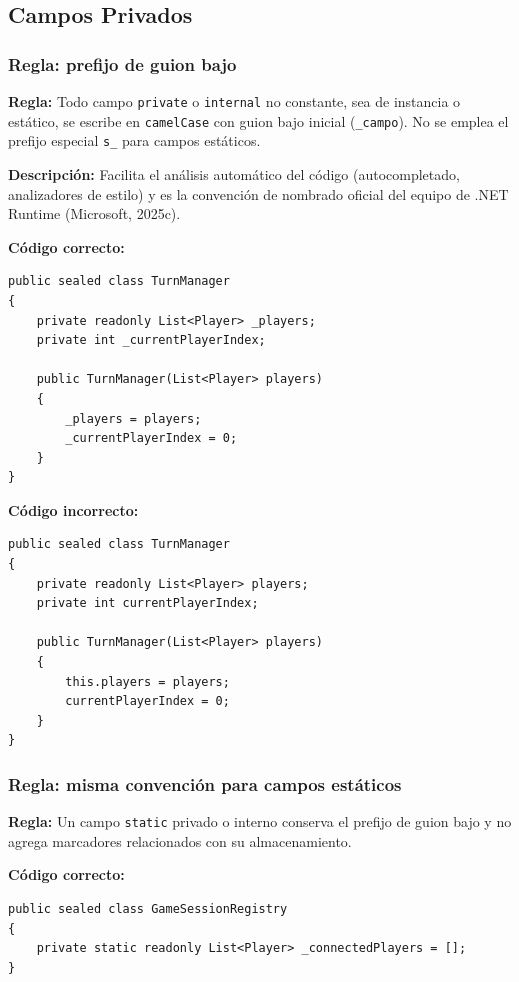 \subsection{Campos Privados}

\subsubsection{Regla: prefijo de guion bajo}

\textbf{Regla:} Todo campo \texttt{private} o \texttt{internal} no constante, sea de instancia o estático, se escribe en \texttt{camelCase} con guion bajo inicial (\texttt{\_campo}). No se emplea el prefijo especial \texttt{s\_} para campos estáticos.

\textbf{Descripción:} Facilita el análisis automático del código (autocompletado, analizadores de estilo) y es la convención de nombrado oficial del equipo de .NET Runtime (Microsoft, 2025c).

\textbf{Código correcto:}
\begin{lstlisting}[style=csharpstyle]
public sealed class TurnManager
{
    private readonly List<Player> _players;
    private int _currentPlayerIndex;

    public TurnManager(List<Player> players)
    {
        _players = players;
        _currentPlayerIndex = 0;
    }
}
\end{lstlisting}

\textbf{Código incorrecto:}
\begin{lstlisting}[style=csharpstyle]
public sealed class TurnManager
{
    private readonly List<Player> players;
    private int currentPlayerIndex;

    public TurnManager(List<Player> players)
    {
        this.players = players;
        currentPlayerIndex = 0;
    }
}
\end{lstlisting}

\subsubsection{Regla: misma convención para campos estáticos}

\textbf{Regla:} Un campo \texttt{static} privado o interno conserva el prefijo de guion bajo y no agrega marcadores relacionados con su almacenamiento.

\textbf{Código correcto:}
\begin{lstlisting}[style=csharpstyle]
public sealed class GameSessionRegistry
{
    private static readonly List<Player> _connectedPlayers = [];
}
\end{lstlisting}

